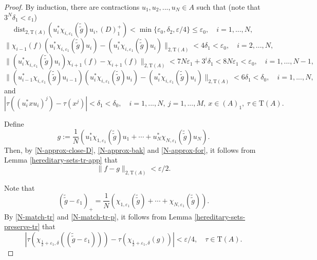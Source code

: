 \documentclass[12pt, oneside, psamsfonts]{amsart}
\theoremstyle{definition}
\theoremstyle{remark}
\numberwithin{equation}{section}
\newcommand{\norm}[1]{\| #1\|}
\newcommand{\abs}[1]{| #1 |}
\newcommand{\eps}{\varepsilon}
\newcommand{\tr}{\mathrm{T}}
\begin{document}
\begin{proof}
By induction, there are contractions $u_1, u_2, ..., u_{N} \in A$ such that (note that $3^N\delta_1 < \eps_1$)
\begin{equation}\label{N-approx-close-D}
\mathrm{dist}_{2, \tr(A)}(u_i^*\chi_{i, \eps_1}(\tilde{\tilde{g}}) u_i, (D)^+_1) < \min\{\eps_0, \delta_2, \eps/4\} \leq \eps_0,\quad i=1, ..., N,
\end{equation}
\begin{equation}\label{N-approx-bak}
 \norm{ \chi_{i-1}(f) (u_{i}^* \chi_{i, \eps_1}(\tilde{\tilde{g}}) u_{i}) - (u_{i}^* \chi_{i, \eps_1}(\tilde{\tilde{g}}) u_{i}) }_{2, \tr(A)} < 4 \delta_1 < \eps_0,\quad i=2, ..., N,
\end{equation}
\begin{equation}\label{N-approx-for}
\norm{ (u_{i}^* \chi_{i, \eps_1}(\tilde{\tilde{g}}) u_{i}) \chi_{i+1}(f) - \chi_{i+1}(f) }_{2, \tr(A)} < 7 N \eps_1 + 3^i\delta_1 < 8N\eps_1 < \eps_0,\quad i=1, ..., N-1, 
\end{equation}
\begin{equation}\label{N-match-tr}
\norm{ (u_{i-1}^* \chi_{i, \eps_1}(\tilde{\tilde{g}}) u_{i-1})(u_{i}^* \chi_{i, \eps_1}(\tilde{\tilde{g}}) u_{i}) - (u_{i}^* \chi_{i, \eps_1}(\tilde{\tilde{g}}) u_{i}) }_{2, \tr(A)} < 6\delta_1 < \delta_0,\quad i=1, ..., N, 
\end{equation}
and
\begin{equation}\label{N-match-tr-p}
\abs{\tau((u_i^* x u_i)^j) - \tau(x^j)} < \delta_1 < \delta_0,\quad i =1, ..., N,\ j=1, ..., M,\  x\in (A)_1,\ \tau \in \tr(A).\end{equation}

Define
$$g:= \frac{1}{N}(u_1^*\chi_{1, \eps_1}(\tilde{\tilde{g}}) u_1 + \cdots + u_N^*\chi_{N, \eps_1}(\tilde{\tilde{g}}) u_N).$$
Then, by \eqref{N-approx-close-D}, \eqref{N-approx-bak} and \eqref{N-approx-for}, it follows from Lemma \ref{hereditary-sets-tr-app} that
\begin{equation}\label{almost-g-1}
 \norm{ f - g}_{2, \tr(A)} < \eps/2.
 \end{equation}

Note that
$$(\tilde{\tilde{g}} - \eps_1)_+ = \frac{1}{N}(\chi_{1, \eps_1}(\tilde{\tilde{g}}) + \cdots + \chi_{N, \eps_1}(\tilde{\tilde{g}}) ).$$
By \eqref{N-match-tr} and  \eqref{N-match-tr-p}, it follows from Lemma \ref{hereditary-sets-preserve-tr} that 
\begin{equation}\label{almost-g-2}
\abs{ \tau(\chi_{\frac{1}{2}+\eps_1, \delta}((\tilde{\tilde{g}} - \eps_1))) - \tau(\chi_{\frac{1}{2}+\eps_1, \delta}(g))} < \eps/4,\quad \tau\in \tr(A). 
\end{equation}


\end{proof}
\end{document}
